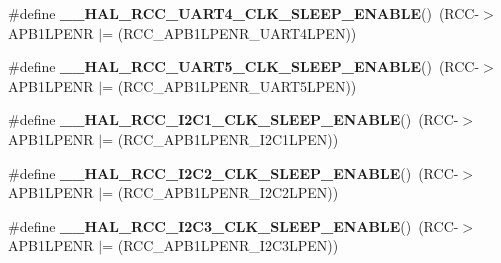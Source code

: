 \begin{DoxyCompactItemize}
\item 
\mbox{\label{group___r_c_c_ex___peripheral___clock___sleep___enable___disable_gac2ea0bded521d6ef463f543719ac6bc2}} 
\#define {\bfseries \+\_\+\+\_\+\+H\+A\+L\+\_\+\+R\+C\+C\+\_\+\+U\+A\+R\+T4\+\_\+\+C\+L\+K\+\_\+\+S\+L\+E\+E\+P\+\_\+\+E\+N\+A\+B\+LE}()~(R\+CC-\/$>$A\+P\+B1\+L\+P\+E\+NR $\vert$= (R\+C\+C\+\_\+\+A\+P\+B1\+L\+P\+E\+N\+R\+\_\+\+U\+A\+R\+T4\+L\+P\+EN))
\item 
\mbox{\label{group___r_c_c_ex___peripheral___clock___sleep___enable___disable_ga81daeac46390e57328957a5b2d020b1b}} 
\#define {\bfseries \+\_\+\+\_\+\+H\+A\+L\+\_\+\+R\+C\+C\+\_\+\+U\+A\+R\+T5\+\_\+\+C\+L\+K\+\_\+\+S\+L\+E\+E\+P\+\_\+\+E\+N\+A\+B\+LE}()~(R\+CC-\/$>$A\+P\+B1\+L\+P\+E\+NR $\vert$= (R\+C\+C\+\_\+\+A\+P\+B1\+L\+P\+E\+N\+R\+\_\+\+U\+A\+R\+T5\+L\+P\+EN))
\item 
\mbox{\label{group___r_c_c_ex___peripheral___clock___sleep___enable___disable_ga894dbeada170b01faef303d35de84917}} 
\#define {\bfseries \+\_\+\+\_\+\+H\+A\+L\+\_\+\+R\+C\+C\+\_\+\+I2\+C1\+\_\+\+C\+L\+K\+\_\+\+S\+L\+E\+E\+P\+\_\+\+E\+N\+A\+B\+LE}()~(R\+CC-\/$>$A\+P\+B1\+L\+P\+E\+NR $\vert$= (R\+C\+C\+\_\+\+A\+P\+B1\+L\+P\+E\+N\+R\+\_\+\+I2\+C1\+L\+P\+EN))
\item 
\mbox{\label{group___r_c_c_ex___peripheral___clock___sleep___enable___disable_gac0167c77fa1c00add900bb1cf788e68c}} 
\#define {\bfseries \+\_\+\+\_\+\+H\+A\+L\+\_\+\+R\+C\+C\+\_\+\+I2\+C2\+\_\+\+C\+L\+K\+\_\+\+S\+L\+E\+E\+P\+\_\+\+E\+N\+A\+B\+LE}()~(R\+CC-\/$>$A\+P\+B1\+L\+P\+E\+NR $\vert$= (R\+C\+C\+\_\+\+A\+P\+B1\+L\+P\+E\+N\+R\+\_\+\+I2\+C2\+L\+P\+EN))
\item 
\mbox{\label{group___r_c_c_ex___peripheral___clock___sleep___enable___disable_ga989121c3284e586d4fb14549d15dc0db}} 
\#define {\bfseries \+\_\+\+\_\+\+H\+A\+L\+\_\+\+R\+C\+C\+\_\+\+I2\+C3\+\_\+\+C\+L\+K\+\_\+\+S\+L\+E\+E\+P\+\_\+\+E\+N\+A\+B\+LE}()~(R\+CC-\/$>$A\+P\+B1\+L\+P\+E\+NR $\vert$= (R\+C\+C\+\_\+\+A\+P\+B1\+L\+P\+E\+N\+R\+\_\+\+I2\+C3\+L\+P\+EN))

\end{DoxyCompactItemize}
